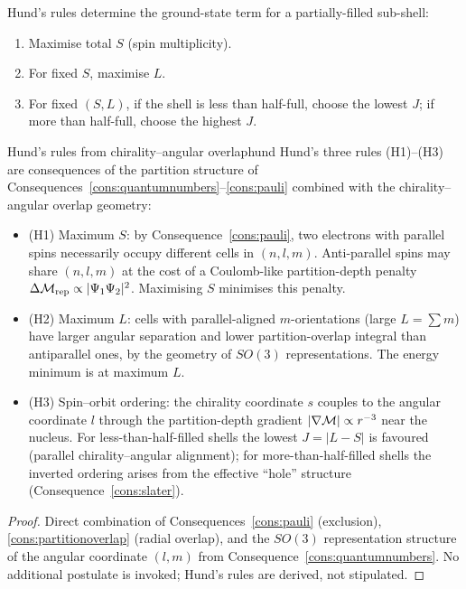 Hund's rules determine the ground-state term for a partially-filled sub-shell:
\begin{enumerate}[label=(H\arabic*)]
\item Maximise total $S$ (spin multiplicity).
\item For fixed $S$, maximise $L$.
\item For fixed $(S,L)$, if the shell is less than half-full, choose the lowest $J$; if more than half-full, choose the highest $J$.
\end{enumerate}
\begin{consequence}{Hund's rules from chirality--angular overlap}{hund}
Hund's three rules (H1)--(H3) are consequences of the partition structure of Consequences~\ref{cons:quantumnumbers}--\ref{cons:pauli} combined with the chirality--angular overlap geometry:
\begin{itemize}
\item (H1) Maximum $S$: by Consequence~\ref{cons:pauli}, two electrons with parallel spins necessarily occupy different cells in $(n,l,m)$. Anti-parallel spins may share $(n,l,m)$ at the cost of a Coulomb-like partition-depth penalty $\Delta\mathcal{M}_{\mathrm{rep}}\propto |\Psi_{1}\Psi_{2}|^{2}$. Maximising $S$ minimises this penalty.
\item (H2) Maximum $L$: cells with parallel-aligned $m$-orientations (large $L=\sum m$) have larger angular separation and lower partition-overlap integral than antiparallel ones, by the geometry of $SO(3)$ representations. The energy minimum is at maximum $L$.
\item (H3) Spin--orbit ordering: the chirality coordinate $s$ couples to the angular coordinate $l$ through the partition-depth gradient $|\nabla\mathcal{M}|\propto r^{-3}$ near the nucleus. For less-than-half-filled shells the lowest $J=|L-S|$ is favoured (parallel chirality--angular alignment); for more-than-half-filled shells the inverted ordering arises from the effective ``hole'' structure (Consequence~\ref{cons:slater}).
\end{itemize}
\end{consequence}

\begin{proof}
Direct combination of Consequences~\ref{cons:pauli} (exclusion), \ref{cons:partitionoverlap} (radial overlap), and the $SO(3)$ representation structure of the angular coordinate $(l,m)$ from Consequence~\ref{cons:quantumnumbers}. No additional postulate is invoked; Hund's rules are derived, not stipulated.
\end{proof}


